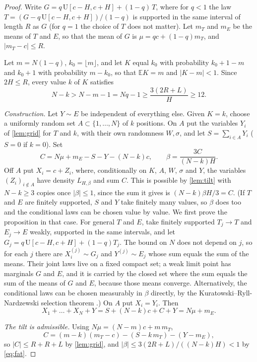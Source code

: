 ﻿\documentclass[11pt]{amsart}
\theoremstyle{remark}
\newcommand{\E}{\mathbb{E}}
\newcommand{\U}{\mathrm{U}}
\begin{document}
\begin{proof}
Write $G=q\,\U[c-H,c+H]+(1-q)\,T$, where for $q<1$ the law $T=(G-q\,\U[c-H,c+H])/(1-q)$ is supported in the same interval of length $R$ as $G$ (for $q=1$ the choice of $T$ does not matter). Let $m_T$ and $m_E$ be the means of $T$ and $E$, so that the mean of $G$ is $\mu=qc+(1-q)m_T$, and $|m_T-c|\le R$.

Let $m=N(1-q)$, $k_0=\lfloor m\rfloor$, and let $K$ equal $k_0$ with probability $k_0+1-m$ and $k_0+1$ with probability $m-k_0$, so that $\E K=m$ and $|K-m|<1$. Since $2H\le R$, every value $k$ of $K$ satisfies
\begin{equation}\label{eq:fat}
N-k>N-m-1=Nq-1\ge\frac{3(2R+L)}{H}\ge 12 .
\end{equation}

\emph{Construction.} Let $Y\sim E$ be independent of everything else. Given $K=k$, choose a uniformly random set $A\subset\{1,\dots,N\}$ of $k$ positions. On $A$ put the variables $Y_i$ of \cref{lem:grid} for $T$ and $k$, with their own randomness $W,\sigma$, and let $S=\sum_{i\in A}Y_i$ ($S=0$ if $k=0$). Set
\[
C=N\mu+m_E-S-Y-(N-k)c,\qquad \beta=\frac{3C}{(N-k)H}.
\]
Off $A$ put $X_i=c+Z_i$, where, conditionally on $K$, $A$, $W$, $\sigma$ and $Y$, the variables $(Z_i)_{i\notin A}$ have density $L_{H,\beta}$ and sum $C$. This is possible by \cref{lem:tilt} with $N-k\ge3$ copies once $|\beta|\le1$, since the sum it gives is $(N-k)\beta H/3=C$. (If $T$ and $E$ are finitely supported, $S$ and $Y$ take finitely many values, so $\beta$ does too and the conditional laws can be chosen value by value. We first prove the proposition in that case. For general $T$ and $E$, take finitely supported $T_j\to T$ and $E_j\to E$ weakly, supported in the same intervals, and let $G_j=q\,\U[c-H,c+H]+(1-q)T_j$. The bound on $N$ does not depend on $j$, so for each $j$ there are $X^{(j)}_i\sim G_j$ and $Y^{(j)}\sim E_j$ whose sum equals the sum of the means. Their joint laws live on a fixed compact set; a weak limit point has marginals $G$ and $E$, and it is carried by the closed set where the sum equals the sum of the means of $G$ and $E$, because those means converge. Alternatively, the conditional laws can be chosen measurably in $\beta$ directly, by the Kuratowski--Ryll-Nardzewski selection theorem \cite[Chapter~18]{AB06}.) On $A$ put $X_i=Y_i$. Then
\[
X_1+\dots+X_N+Y=S+(N-k)c+C+Y=N\mu+m_E .
\]

\emph{The tilt is admissible.} Using $N\mu=(N-m)c+m\,m_T$,
\[
C=(m-k)(m_T-c)-(S-k\,m_T)-(Y-m_E),
\]
so $|C|\le R+R+L$ by \cref{lem:grid}, and $|\beta|\le 3(2R+L)/((N-k)H)<1$ by \eqref{eq:fat}.


\end{proof}
\end{document}
